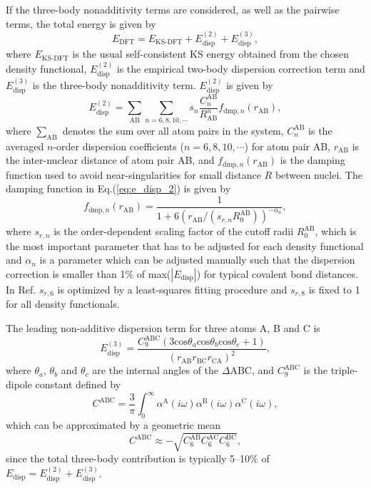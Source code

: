 If the three-body nonadditivity terms are considered, as well as the pairwise terms, the total energy is given by 
\begin{equation}
    E_{\text{DFT}} = E_{\text{KS-DFT}}+E_{\text{disp}}^{(2)}+E_{\text{disp}}^{(3)},
\label{eq:e_dftd3}
\end{equation}
where $E_{\text{KS-DFT}}$ is the usual self-consistent KS energy obtained from the chosen density functional, $E_{\text{disp}}^{(2)}$ is the empirical two-body  dispersion correction term and $E_{\text{disp}}^{(3)}$ is the three-body nonadditivity term. $E_{\text{disp}}^{(2)}$ is given by
\begin{equation}
    E_{\text{disp}}^{(2)} = \sum_{\text{AB}}\sum_{n=6,8,10,\cdots}s_n\frac{C_n^{\text{AB}}}{R_{\text{AB}}^n}f_{\text{dmp},n}(r_{\text{AB}}),
    \label{eq:e_disp_2}
\end{equation}
where $\sum\limits_{\text{AB}}$ denotes the sum over all atom pairs in the system\cite{Zeiss1977},
$C_n^{\text{AB}}$ is the averaged $n$-order dispersion coefficients ($n=6{,}8{,}10{,}\cdots$) for atom pair AB,
$r_{\text{AB}}$  is the inter-nuclear distance of atom pair AB,
and $f_{\text{dmp},n}(r_{\text{AB}})$ is the damping function used to avoid near-singularities for small distance $R$  between nuclei.
The damping function in Eq.\thinspace(\ref{eq:e_disp_2}) is given by 
\begin{equation}
    f_{\text{dmp},n}(r_{\text{AB}}) = \frac{1}{1+6(r_{\text{AB}}/(s_{r,n}R_0^{\text{AB}}))^{-\alpha_n}},
    \label{eq:e_damping}
\end{equation}
where $s_{r,n}$ is the order-dependent scaling factor of the cutoff radii $R_0^{\text{AB}}$, 
which is the most important parameter that has to be adjusted for each density functional 
and $\alpha_n$ is a parameter which can be adjusted manually such that the dispersion correction is 
smaller than 1\% of max($|E_{\text{disp}}|$) for typical covalent bond distances.
In Ref.\cite{Grimme10} $s_{r,6}$ is optimized by a least-squares fitting procedure and $s_{r,8}$ is fixed to 1 for all density functionals.

The leading non-additive dispersion term for three atoms A, B and C is
\begin{equation}
    E_{\text{disp}}^{(3)} =\frac{C_9^{\text{ABC}}(3\text{cos}\theta_a\text{cos}\theta_b \text{cos}\theta_c+1)}{(r_{\text{AB}}r_{\text{BC}}r_{\text{CA}})^2},
\label{eq:e_ABC}
\end{equation}
where $\theta_a$, $\theta_b$ and $\theta_c$ are the internal angles of the $\Delta$ABC,
and $C_9^{\text{ABC}}$ is the triple-dipole constant defined by 
\begin{equation}
  C^{\text{ABC}} =\frac{3}{\pi}\int_0^{\infty}\alpha^{\text{A}}(i\omega)\alpha^{\text{B}}(i\omega)\alpha^{\text{C}}(i\omega),
\label{eq:C_ABC}
\end{equation}
which can be approximated by a geometric mean
\begin{equation}
C^{\text{ABC}} \approx -\sqrt{C_6^{\text{AB}}C_6^{\text{AC}}C_6^{\text{BC}}},
\label{eq:C_ABC_approx}
\end{equation}
since the total three-body contribution is typically 5--10\% of $E_{\text{disp}}=E_{\text{disp}}^{(2)}+E_{\text{disp}}^{(3)}$.
%
